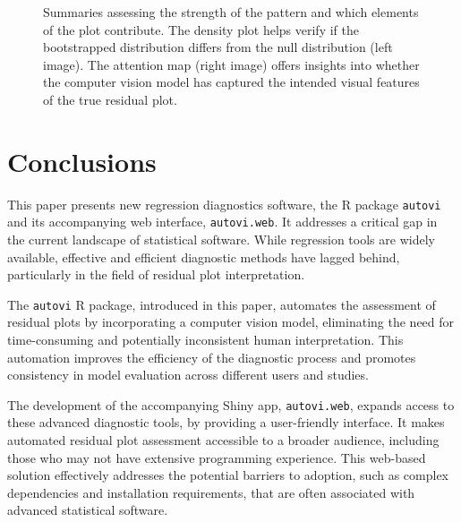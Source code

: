\documentclass[
doublespace,
  times]{anzsauth}
\begin{document}
\begin{figure}


\caption{\label{fig-autovi-web-distributions}Summaries assessing the
strength of the pattern and which elements of the plot contribute. The
density plot helps verify if the bootstrapped distribution differs from
the null distribution (left image). The attention map (right image)
offers insights into whether the computer vision model has captured the
intended visual features of the true residual plot.}

\end{figure}%

\section{Conclusions}\label{sec-autovi-conclusion}

This paper presents new regression diagnostics software, the R package
\texttt{autovi} and its accompanying web interface, \texttt{autovi.web}.
It addresses a critical gap in the current landscape of statistical
software. While regression tools are widely available, effective and
efficient diagnostic methods have lagged behind, particularly in the
field of residual plot interpretation.

The \texttt{autovi} R package, introduced in this paper, automates the
assessment of residual plots by incorporating a computer vision model,
eliminating the need for time-consuming and potentially inconsistent
human interpretation. This automation improves the efficiency of the
diagnostic process and promotes consistency in model evaluation across
different users and studies.

The development of the accompanying Shiny app, \texttt{autovi.web},
expands access to these advanced diagnostic tools, by providing a
user-friendly interface. It makes automated residual plot assessment
accessible to a broader audience, including those who may not have
extensive programming experience. This web-based solution effectively
addresses the potential barriers to adoption, such as complex
dependencies and installation requirements, that are often associated
with advanced statistical software.
\end{document}
